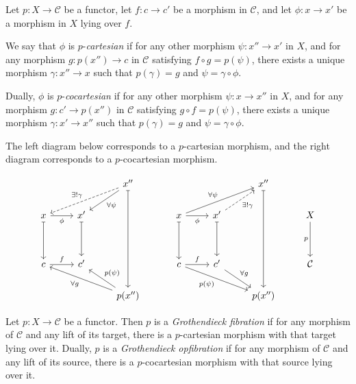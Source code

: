 \documentclass{MetricNotes2023}
\begin{document}
\begin{definition}
Let \(p : X \to \mathcal{C}\) be a functor, let \(f : c \to c'\) be a morphism in \(\mathcal{C}\), and let \(\phi : x \to x'\) be a morphism in \(X\) lying over \(f\).

We say that \(\phi\) is \(p\)-\textit{cartesian} if for any other morphism \(\psi : x'' \to x'\) in \(X\), and for any morphism \(g : p(x'')\to c\) in \(\mathcal{C}\) satisfying \(f \circ g = p(\psi)\), there exists a unique morphism \(\gamma : x'' \to x\) such that \(p(\gamma)=g\) and \(\psi = \gamma \circ \phi\).

Dually, \(\phi\) is \(p\)-\textit{cocartesian} if for any other morphism \(\psi : x \to x''\) in \(X\), and for any morphism \(g : c' \to p(x'')\) in \(\mathcal{C}\) satisfying \(g \circ f = p(\psi)\), there exists a unique morphism \(\gamma : x' \to x''\) such that \(p(\gamma)=g\) and \(\psi = \gamma \circ \phi\).  

The left diagram below corresponds to a \(p\)-cartesian morphism, and the right diagram corresponds to a \(p\)-cocartesian morphism.

\[\begin{tikzcd}
 & & x'' \arrow[dddd, mapsto, ""] \arrow[dll, dashrightarrow, swap, "\exists ! \gamma"] \arrow[dl, "\forall \psi"] \\
x \arrow[r, swap, "\phi"] \arrow[dd, mapsto, swap, ""] & x' \arrow[dd, mapsto, swap, ""]  & \\
& & \\
c \arrow[r, "f"] & c'  & \\
 & & p(x'') \arrow[llu, "\forall g"] \arrow[lu, swap, "p(\psi)"] 
\end{tikzcd}\qquad\quad \begin{tikzcd}
 & & x'' \arrow[dddd, mapsto, ""] & \\
x \arrow[r, swap, "\phi"] \arrow[dd, mapsto, swap, ""] \arrow[urr, "\forall \psi"] & x' \arrow[dd, mapsto, swap, ""] \arrow[ur, dashrightarrow, swap, "\exists! \gamma"] & & X \arrow[dd, swap, "p"] \\
& & & \\
c \arrow[r, "f"] \arrow[rrd, swap, "p(\psi)"] & c' \arrow[rd, "\forall g"]  & & \mathcal{C}\\
 & & p(x'') & 
\end{tikzcd}\]

\end{definition}

\begin{definition}\label{opfibration}
Let \(p : X \to \mathcal{C}\) be a functor. Then \(p\) is a \textit{Grothendieck fibration} if for any morphism of \(\mathcal{C}\) and any lift of its target, there is a \(p\)-cartesian morphism with that target lying over it. Dually, \(p\) is a \textit{Grothendieck opfibration} if for any morphism of \(\mathcal{C}\) and any lift of its source, there  is a \(p\)-cocartesian morphism with that source lying over it.
\end{definition}
\end{document}
